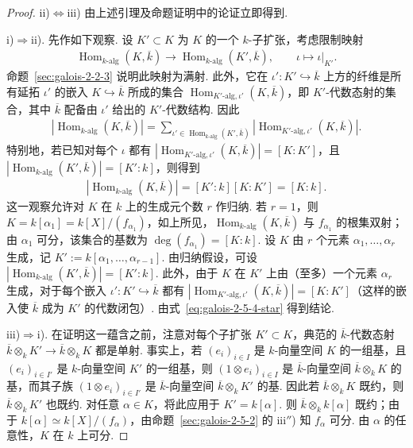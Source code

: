 \begin{proof}
ii)$\Leftrightarrow$iii) 由上述引理及命题证明中的论证立即得到.

i)$\Rightarrow$ii). 先作如下观察. 设 $K'\subset K$ 为 $K$ 的一个 $k$-子扩张，考虑限制映射
\begin{align*}
\operatorname{Hom}_{k\text{-alg}}(K,\overline k)\longrightarrow\operatorname{Hom}_{k\text{-alg}}(K',\overline k),\qquad\iota\longmapsto\iota|_{K'}.
\end{align*}
命题~\ref{sec:galois-2-2-3} 说明此映射为满射. 此外，它在 $\iota':K'\hookrightarrow\overline k$ 上方的纤维是所有延拓 $\iota'$ 的嵌入 $K\hookrightarrow\overline k$ 所成的集合 $\operatorname{Hom}_{K'\text{-alg},\iota'}(K,\overline k)$，即 $K'$-代数态射的集合，其中 $\overline k$ 配备由 $\iota'$ 给出的 $K'$-代数结构. 因此
\begin{align*}
|\operatorname{Hom}_{k\text{-alg}}(K,\overline k)|=\sum_{\iota'\in\operatorname{Hom}_{k\text{-alg}}(K',\overline k)}|\operatorname{Hom}_{K'\text{-alg},\iota'}(K,\overline k)|.
\end{align*}
特别地，若已知对每个 $\iota$ 都有 $|\operatorname{Hom}_{K'\text{-alg},\iota'}(K,\overline k)|=[K:K']$，且 $|\operatorname{Hom}_{k\text{-alg}}(K',\overline k)|=[K':k]$，则得到
\begin{align*}
|\operatorname{Hom}_{k\text{-alg}}(K,\overline k)|=[K':k][K:K']=[K:k].\tag{*}\label{eq:galois-2-5-4-star}
\end{align*}
这一观察允许对 $K$ 在 $k$ 上的生成元个数 $r$ 作归纳. 若 $r=1$，则 $K=k[\alpha_1]=k[X]/(f_{\alpha_1})$，如上所见，$\operatorname{Hom}_{k\text{-alg}}(K,\overline k)$ 与 $f_{\alpha_1}$ 的根集双射；由 $\alpha_1$ 可分，该集合的基数为 $\deg(f_{\alpha_1})=[K:k]$. 设 $K$ 由 $r$ 个元素 $\alpha_1,\ldots,\alpha_r$ 生成，记 $K':=k[\alpha_1,\ldots,\alpha_{r-1}]$. 由归纳假设，可设 $|\operatorname{Hom}_{k\text{-alg}}(K',\overline k)|=[K':k]$. 此外，由于 $K$ 在 $K'$ 上由（至多）一个元素 $\alpha_r$ 生成，对于每个嵌入 $\iota':K'\hookrightarrow\overline k$ 都有 $|\operatorname{Hom}_{K'\text{-alg},\iota'}(K,\overline k)|=[K:K']$（这样的嵌入使 $\overline k$ 成为 $K'$ 的代数闭包）. 由式~\eqref{eq:galois-2-5-4-star} 得到结论.

iii)$\Rightarrow$i). 在证明这一蕴含之前，注意对每个子扩张 $K'\subset K$，典范的 $\overline k$-代数态射 $\overline k\otimes_k K'\longrightarrow\overline k\otimes_k K$ 都是单射. 事实上，若 $(e_i)_{i\in I}$ 是 $k$-向量空间 $K$ 的一组基，且 $(e_i)_{i\in I'}$ 是 $k$-向量空间 $K'$ 的一组基，则 $(1\otimes e_i)_{i\in I}$ 是 $\overline k$-向量空间 $\overline k\otimes_k K$ 的基，而其子族 $(1\otimes e_i)_{i\in I'}$ 是 $\overline k$-向量空间 $\overline k\otimes_k K'$ 的基. 因此若 $\overline k\otimes_k K$ 既约，则 $\overline k\otimes_k K'$ 也既约. 对任意 $\alpha\in K$，将此应用于 $K'=k[\alpha]$. 则 $\overline k\otimes_k k[\alpha]$ 既约；由于 $k[\alpha]\simeq k[X]/(f_\alpha)$，由命题~\ref{sec:galois-2-5-2} 的 iii$''$) 知 $f_\alpha$ 可分. 由 $\alpha$ 的任意性，$K$ 在 $k$ 上可分.
\end{proof}
